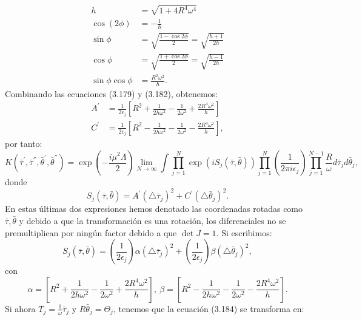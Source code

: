 \begin{align}
\nonumber h&=\sqrt{1+4R^4\omega^4}\\
\nonumber \cos(2\phi)&=-\frac{1}{h}\\
\nonumber \sin\phi&=\sqrt{\frac{1-\cos2\phi}{2}}=\sqrt{\frac{h+1}{2h}}\\
\nonumber \cos\phi&=\sqrt{\frac{1+\cos2\phi}{2}}=\sqrt{\frac{h-1}{2h}}\\
\sin\phi\cos\phi&=\frac{R^{2}\omega^{2}}{h}.
\end{align}
Combinando las ecuaciones (3.179) y (3.182), obtenemos:
\begin{align}
\nonumber A^{'}&=\frac{1}{2\epsilon_{j}}\left[R^{2}+\frac{1}{2h\omega^{2}}-\frac{1}{2\omega^{2}}+\frac{2R^{4}\omega^{2}}{h}\right]\\
C^{'}&=\frac{1}{2\epsilon_{j}}\left[R^{2}-\frac{1}{2h\omega^{2}}-\frac{1}{2\omega^{2}}-\frac{2R^{4}\omega^{2}}{h}\right],
\end{align}
por tanto:
\begin{equation}
K(\bar{\tau}^{'},\bar{\tau}^{''},\bar{\theta}^{'},\bar{\theta}^{''})=\exp\left(-\frac{i\mu^{2}\Lambda}{2}\right)\lim_{N\to\infty}\int\prod_{j=1}^{N}\exp(iS_{j}(\bar{\tau},\bar{\theta}))\prod_{j=1}^{N}\left(\frac{1}{2\pi i\epsilon_{j}}\right)\prod_{j=1}^{N-1}\frac{R}{\omega}d\bar{\tau}_{j}d\bar{\theta}_{j},
\end{equation}
donde
\begin{equation}
S_{j}(\bar{\tau},\bar{\theta})=A^{'}(\triangle\bar{\tau}_{j})^{2}+C^{'}(\triangle\bar{\theta}_{j})^{2}.
\end{equation}
En estas últimas dos expresiones hemos denotado las coordenadas rotadas como $\bar{\tau},\bar{\theta}$ y debido a que la transformación es una rotación, los diferenciales no se premultiplican por ningún factor debido a que $\det J=1$. Si escribimos:
\begin{equation}
S_{j}(\bar{\tau},\bar{\theta})=\left(\frac{1}{2\epsilon_{j}}\right)\alpha(\triangle\bar{\tau}_{j})^{2}+\left(\frac{1}{2\epsilon_{j}}\right)\beta(\triangle\bar{\theta}_{j})^{2},
\end{equation}
con
\begin{equation}
\alpha=\left[R^{2}+\frac{1}{2h\omega^{2}}-\frac{1}{2\omega^{2}}+\frac{2R^{4}\omega^{2}}{h}\right],\ \beta=\left[R^{2}-\frac{1}{2h\omega^{2}}-\frac{1}{2\omega^{2}}-\frac{2R^{4}\omega^{2}}{h}\right].
\end{equation}
Si ahora $T_j=\frac{1}{\omega}\bar{\tau}_j$ y $R\bar{\theta}_j=\Theta_j$, tenemos que la ecuación (3.184) se transforma en:
